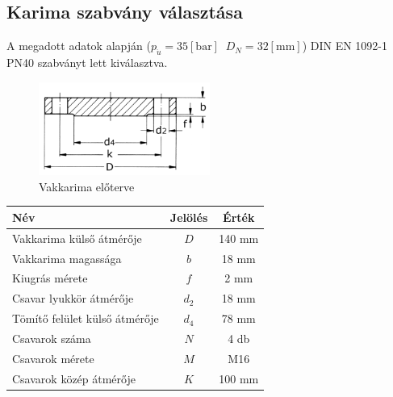 \documentclass[10pt, a4paper]{article}
\newcommand{\baar}{\mathrm{\left[bar\right]}}
\newcommand{\mm}{\mathrm{\left[mm\right]}}
\begin{document}
	\subsection{Karima szabvány választása}
	A megadott adatok alapján ($p_{\ddot{u}} = 35\baar\;\;D_N = 32\mm$) DIN EN 1092-1 PN40 szabványt lett kiválasztva.
	\begin{figure}[h]
		\centering
		\includegraphics[width=0.5\textwidth]{ vakkarima_eloterv.png }
		\caption{Vakkarima előterve}
		\label{fig:vakkarima}
	\end{figure}
	\renewcommand{\arraystretch}{1.4}
	\begin{table}[h]
		\centering
		\begin{tabular}{l|c|c}
			\textbf{Név}                              & \textbf{Jelölés} & \textbf{Érték} \\ \hline
			Vakkarima külső átmérője                     & $D$                & 140 mm           \\
			Vakkarima magassága                          & $b$                & 18 mm			\\
			Kiugrás mérete                            & $f$                & 2 mm           \\
			Csavar lyukkör átmérője                   & $d_2$             & 18 mm           \\
			Tömítő felület külső átmérője             & $d_4$             & 78 mm           \\
			Csavarok száma                            & $N$                & 4 db           \\
			Csavarok mérete                           & $M$                & M16          \\ 
			Csavarok közép átmérője                   & $K$                & 100 mm             
		\end{tabular}
	\end{table}
	\renewcommand{\arraystretch}{1}
\end{document}
